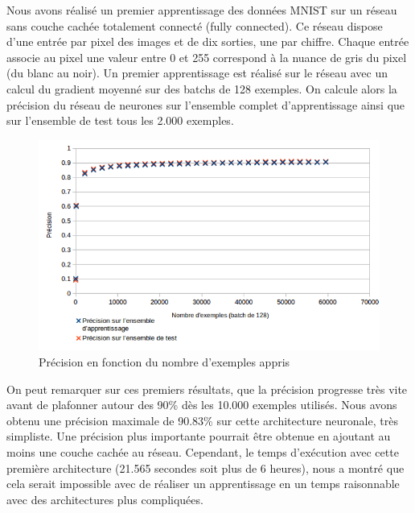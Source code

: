 \documentclass{report}
\theoremstyle{plain}
\theoremstyle{definition}
\theoremstyle{remark}
\begin{document}
Nous avons réalisé un premier apprentissage des données MNIST sur un réseau sans couche cachée totalement connecté (fully connected). Ce réseau dispose d'une entrée par pixel des images et de dix sorties, une par chiffre. Chaque entrée associe au pixel une valeur entre 0 et 255 correspond à la nuance de gris du pixel (du blanc au noir). Un premier apprentissage est réalisé sur le réseau avec un calcul du gradient moyenné sur des batchs de 128 exemples. On calcule alors la précision du réseau de neurones sur l'ensemble complet d'apprentissage ainsi que sur l'ensemble de test tous les 2.000 exemples.

\begin{figure}[!h]
\begin{center}
\includegraphics[scale=0.5]{images/mnist_apprentissage_128.png}
\caption{Précision en fonction du nombre d'exemples appris}
\label{mnist_apprentissage_128}
\end{center}
\end{figure}

On peut remarquer sur ces premiers résultats, que la précision progresse très vite avant de plafonner autour des 90\% dès les 10.000 exemples utilisés. Nous avons obtenu une précision maximale de 90.83\% sur cette architecture neuronale, très simpliste. Une précision plus importante pourrait être obtenue en ajoutant au moins une couche cachée au réseau. Cependant, le temps d'exécution avec cette première architecture (21.565 secondes soit plus de 6 heures), nous a montré que cela serait impossible avec de réaliser un apprentissage en un temps raisonnable avec des architectures plus compliquées.
\label{resultat_premiere_implementation}
\end{document}
